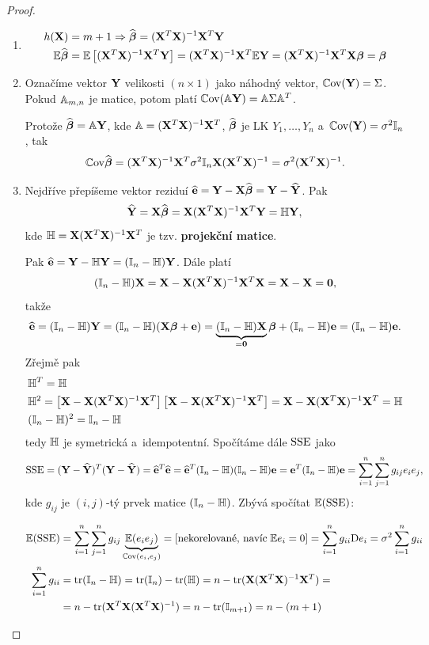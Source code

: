 \begin{proof}
\begin{enumerate}
\item
\begin{align*}
	h(\X) & = m + 1 \Rightarrow \wbetab = (\X^T \X)^{-1} \X^T \Y \\
	\E \wbetab & = \E \left[(\X^T \X)^{-1} \X^T \Y \right] = (\X^T \X)^{-1} \X^T \E\Y = (\X^T \X)^{-1} \X^T \X \betab = \betab
\end{align*}

\item
Označíme vektor $\Y$ velikosti $(n \times 1)$ jako náhodný vektor, $\Cov(\Y) = \Sigma$. Pokud $\Am_{m, n}$ je matice, potom platí $\Cov(\Am \Y) = \Am \Sigma \Am^T$.

Protože $\wbetab = \Am \Y$, kde $\Am = (\X^T \X)^{-1} \X^T$, $\wbetab$ je LK $Y_1, \dots, Y_n$ a~$\Cov(\Y) = \sigma^2 \In$, tak
 $$
	\Cov \wbetab = (\X^T \X)^{-1} \X^T \sigma^2 \In \X (\X^T \X)^{-1} = \sigma^2 (\X^T \X)^{-1}.
 $$

\item
Nejdříve přepíšeme vektor reziduí $\heb = \Y - \X \wbetab = \Y - \hYb$. Pak
\begin{equation}
	\hYb = \X \wbetab = \X (\X^T \X)^{-1} \X^T \Y = \Hm \Y,
	\label{Eq: HY}
\end{equation}
kde $\Hm = \X (\X^T \X)^{-1} \X^T$ je tzv. \textbf{projekční matice}.
 
Pak $\heb = \Y - \Hm \Y = (\In - \Hm) \Y$. Dále platí
$$(\In - \Hm) \X = \X - \X (\X^T \X)^{-1} \X^T \X = \X - \X = \boldsymbol{0},$$
takže
 $$
	\heb = (\In - \Hm) \Y = (\In - \Hm)(\X \betab + \eb) = \underbrace{(\In - \Hm) \X}_{ = \boldsymbol{0}} \betab + (\In - \Hm) \eb = (\In - \Hm) \eb.
 $$
Zřejmě pak
\begin{align*}
& \Hm^T = \Hm \\
& \Hm^2 = \left[\X - \X (\X^T \X)^{-1} \X^T \right] \left[\X - \X (\X^T \X)^{-1} \X^T \right] = \X - \X (\X^T \X)^{-1} \X^T = \Hm \\
& (\In - \Hm)^2 = \In - \Hm
\end{align*}
tedy $\Hm$ je symetrická a~idempotentní. Spočítáme dále $\SSE$ jako
 $$
	\SSE = (\Y - \hYb)^T(\Y - \hYb) = \heb^T \heb = \heb^T (\In - \Hm)(\In - \Hm) \eb = \eb^T (\In - \Hm) \eb = \sumin \sumjn g_{ij} e_i e_j,
 $$
kde $g_{ij}$ je $(i,j)$-tý prvek matice $(\In - \Hm)$. Zbývá spočítat $\E(\SSE)$:

\begin{align*}
	\E(\SSE) & = \sumin \sumjn g_{ij} \underbrace{\E(e_i e_j)}_{\Cov(e_i, e_j)} = \left[\text{nekorelované, navíc\;} \E e_i = 0 \right] = \sumin g_{ii} \D e_i = \sigma^2 \sumin g_{ii} \\
	\sumin g_{ii} & = \trace(\In - \Hm) = \trace(\In) - \trace(\Hm) = n - \trace(\X (\X^T \X)^{-1} \X^T) = \\
	& = n - \trace(\X^T \X (\X^T \X)^{-1}) = n - \trace(\Identita{m+1}) = n - (m + 1)
\end{align*}


\end{enumerate}
\end{proof}
